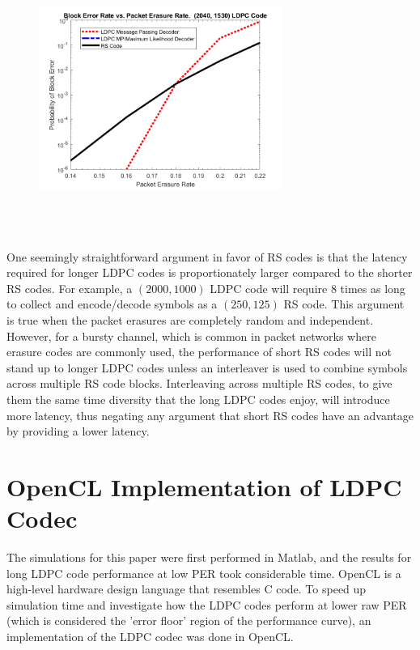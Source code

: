 \documentclass[conference]{IEEEtran}
\begin{document}
\begin{figure}[htbp]
	\centerline{\includegraphics[height=3.5in, width = 3.15in]{LDPC_triangular_2040_1530_Perf_vs_RS.png}}
	\caption{}
	\label{fig:LDPC_triangular_2040_1530_Perf_vs_RS}
\end{figure}

One seemingly straightforward argument in favor of RS codes is that the latency required for longer LDPC codes is proportionately larger compared to the shorter RS codes.  For example, a $(2000, 1000)$ LDPC code will require 8 times as long to collect and encode/decode symbols as a $(250, 125)$ RS code.  This argument is true when the packet erasures are completely random and independent.  However, for a bursty channel, which is common in packet networks where erasure codes are commonly used, the performance of short RS codes will not stand up to longer LDPC codes unless an interleaver is used to combine symbols across multiple RS code blocks.  Interleaving across multiple RS codes, to give them the same time diversity that the long LDPC codes enjoy, will introduce more latency, thus negating any argument that short RS codes have an advantage by providing a lower latency.



\section{OpenCL Implementation of LDPC Codec}\label{sec:Implementation}

The simulations for this paper were first performed in Matlab, and the results for long LDPC code performance at low PER took considerable time.  OpenCL is a high-level hardware design language that resembles C code. To speed up simulation time and investigate how the LDPC codes perform at lower raw PER (which is considered the 'error floor' region of the performance curve), an implementation of the LDPC codec was done in OpenCL.
\end{document}

